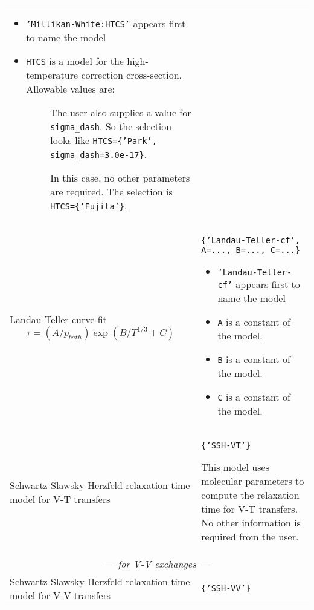 \begin{landscape}
\begin{center}
\begin{longtable}{p{7cm}p{15cm}}
                          \begin{itemize}
                          \item \texttt{'Millikan-White:HTCS'} appears first to name the model 
                          \item \texttt{HTCS} is a model for the high-temperature correction cross-section.
                                 Allowable values are:
                                \begin{description}
                                \item[\texttt{'Park'}] The user also supplies a value for \texttt{sigma\_dash}.
                                So the selection looks like \texttt{HTCS=\{'Park', sigma\_dash=3.0e-17\}}.
                                \item[\texttt{'Fujita'}] In this case, no other parameters are required. The selection is \texttt{HTCS=\{'Fujita'\}}.
                                 \end{description}
                         \end{itemize} \\ 
Landau-Teller curve fit
\[ \tau = (A/p_{bath})\exp(B/T^{1/3} + C) \] &
                       \texttt{\{'Landau-Teller-cf', A=..., B=..., C=...\}}
                          \begin{itemize}
                          \item \texttt{'Landau-Teller-cf'} appears first to name the model 
                          \item \texttt{A} is a constant of the model.
                          \item \texttt{B} is a constant of the model.
                          \item \texttt{C} is a constant of the model.
                         \end{itemize} \\
Schwartz-Slawsky-Herzfeld relaxation time
model for V-T transfers &
                       \texttt{\{'SSH-VT'\}}

                        This model uses molecular parameters to compute the relaxation time for V-T transfers. No other information is required from the user. \\ \midrule
\multicolumn{2}{c}{\emph{--- for V-V exchanges ---}} \\ \midrule
Schwartz-Slawsky-Herzfeld relaxation time
model for V-V transfers &
                       \texttt{\{'SSH-VV'\}}


\end{longtable}
\end{center}
\end{landscape}
